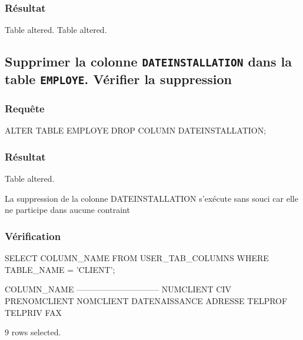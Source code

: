 \documentclass[•]{article}
\begin{document}
\subsubsection{Résultat}
\begin{sql}
Table altered.
Table altered.
\end{sql}
\subsection{Supprimer la colonne \texttt{DATEINSTALLATION} dans la table \texttt{EMPLOYE}. Vérifier la suppression}
\subsubsection{Requête}
\begin{sql}
ALTER TABLE EMPLOYE DROP COLUMN DATEINSTALLATION;
\end{sql}
\subsubsection{Résultat}
\begin{sql}
Table altered.
\end{sql}
\textrm{La suppression de la colonne DATEINSTALLATION s'exécute sans souci car elle ne participe dans aucune contraint}
\subsubsection{Vérification}
\begin{sql}
SELECT COLUMN_NAME FROM USER_TAB_COLUMNS WHERE TABLE_NAME = 'CLIENT';

COLUMN_NAME                                                                     
------------------------------                                                  
NUMCLIENT                                                                       
CIV                                                                             
PRENOMCLIENT                                                                    
NOMCLIENT                                                                       
DATENAISSANCE                                                                   
ADRESSE                                                                         
TELPROF                                                                         
TELPRIV                                                                         
FAX                                                                             

9 rows selected.
\end{sql}
\end{document}
